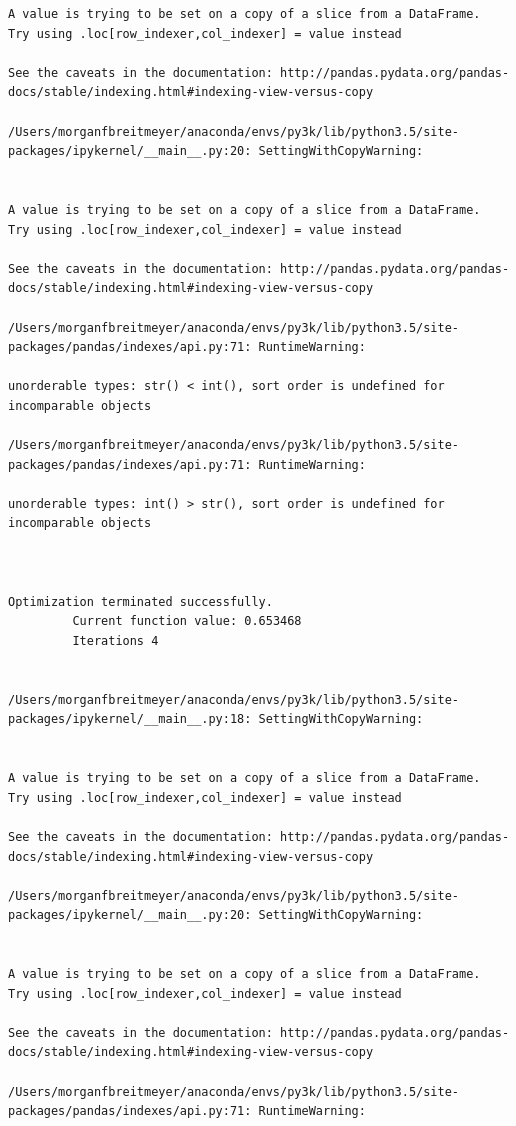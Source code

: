 \begin{lstlisting}
A value is trying to be set on a copy of a slice from a DataFrame.
Try using .loc[row_indexer,col_indexer] = value instead

See the caveats in the documentation: http://pandas.pydata.org/pandas-docs/stable/indexing.html#indexing-view-versus-copy

/Users/morganfbreitmeyer/anaconda/envs/py3k/lib/python3.5/site-packages/ipykernel/__main__.py:20: SettingWithCopyWarning:


A value is trying to be set on a copy of a slice from a DataFrame.
Try using .loc[row_indexer,col_indexer] = value instead

See the caveats in the documentation: http://pandas.pydata.org/pandas-docs/stable/indexing.html#indexing-view-versus-copy

/Users/morganfbreitmeyer/anaconda/envs/py3k/lib/python3.5/site-packages/pandas/indexes/api.py:71: RuntimeWarning:

unorderable types: str() < int(), sort order is undefined for incomparable objects

/Users/morganfbreitmeyer/anaconda/envs/py3k/lib/python3.5/site-packages/pandas/indexes/api.py:71: RuntimeWarning:

unorderable types: int() > str(), sort order is undefined for incomparable objects



Optimization terminated successfully.
         Current function value: 0.653468
         Iterations 4


/Users/morganfbreitmeyer/anaconda/envs/py3k/lib/python3.5/site-packages/ipykernel/__main__.py:18: SettingWithCopyWarning:


A value is trying to be set on a copy of a slice from a DataFrame.
Try using .loc[row_indexer,col_indexer] = value instead

See the caveats in the documentation: http://pandas.pydata.org/pandas-docs/stable/indexing.html#indexing-view-versus-copy

/Users/morganfbreitmeyer/anaconda/envs/py3k/lib/python3.5/site-packages/ipykernel/__main__.py:20: SettingWithCopyWarning:


A value is trying to be set on a copy of a slice from a DataFrame.
Try using .loc[row_indexer,col_indexer] = value instead

See the caveats in the documentation: http://pandas.pydata.org/pandas-docs/stable/indexing.html#indexing-view-versus-copy

/Users/morganfbreitmeyer/anaconda/envs/py3k/lib/python3.5/site-packages/pandas/indexes/api.py:71: RuntimeWarning:


\end{lstlisting}
